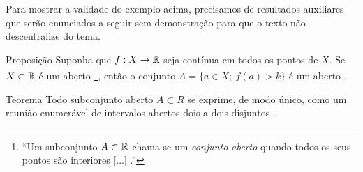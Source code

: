 		Para mostrar a validade do exemplo acima, precisamos de resultados auxiliares que serão enunciados a seguir sem demonstração para que o texto não descentralize do tema.
		\vspace{-0.2cm}
	\begin{env}{Proposição}
	\label{cit:função-continua-mensuravel}
		Suponha que $f:X \to \mathbb{R}$ seja contínua em todos os pontos de $X$.
		Se $X \subset \mathbb{R}$ é um aberto 
		\footnote{\enquote{Um subconjunto $A \subset \mathbb{R}$ chama-se um \textit{conjunto aberto} quando
			todos os seus pontos são interiores [...] \cite[p.164]{elon}.}}, 
		então o conjunto $A = \{a \in X;\ f(a)>k\}$ é um aberto \cite[p.226]{elon}.
		\vspace{-0.2cm}
	\end{env}
	\begin{env}{Teorema}
		\label{teo:estrutura-abertos-reta}
		Todo subconjunto aberto $A \subset R$ se exprime, de modo único, como um reunião enumerável de intervalos abertos dois a dois disjuntos \cite[p.167]{elon}.
		\vspace{-0.2cm}
	\end{env}

